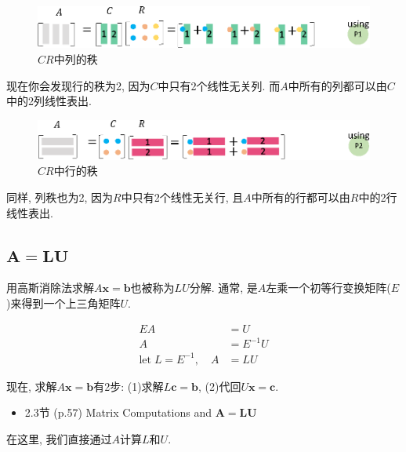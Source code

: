 \documentclass[letterpaper]{article}
\begin{document}
\begin{figure}[H]
  \centering
  \includegraphics[scale=0.8]{CR1.eps}
  \caption{$CR$中列的秩}
\end{figure}

现在你会发现行的秩为2, 因为$C$中只有2个线性无关列. 
而$A$中所有的列都可以由$C$中的2列线性表出. 

\begin{figure}[H]
  \centering
  \includegraphics[scale=0.8]{CR2.eps}
  \caption{$CR$中行的秩}
\end{figure}

同样, 列秩也为2, 因为$R$中只有2个线性无关行, 且$A$中所有的行都可以由$R$中的2行线性表出. 

\subsection{$\boldsymbol{A=LU}$}

用高斯消除法求解$A\bm{x}=\bm{b}$也被称为$LU$分解. 
通常, 是$A$左乘一个初等行变换矩阵($E$)来得到一个上三角矩阵$U$. 

\begin{align*}
  EA &= U\\
  A &= E^{-1}U\\
\text{let} \; L = E^{-1}, \quad  A &= LU
\end{align*}

现在, 求解$A\bm{x}=\bm{b}$有2步: (1)求解$L\bm{c}=\bm{b}$, (2)代回$U\bm{x}=\bm{c}$. 


\begin{itemize}
  \item 2.3节 (p.57) Matrix Computations and $\bm{A=LU}$
\end{itemize}

在这里, 我们直接通过$A$计算$L$和$U$.
\end{document}

